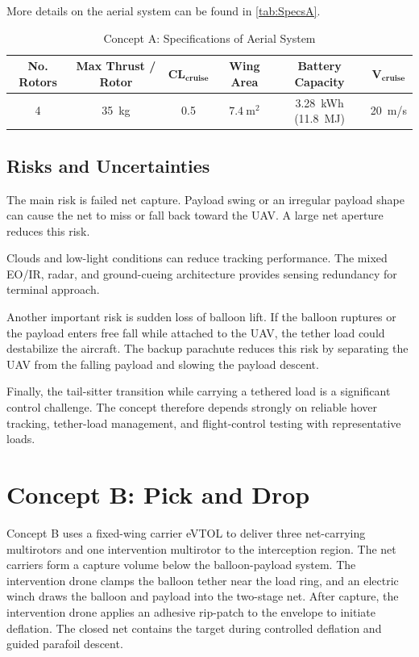 More details on the aerial system can be found in \autoref{tab:SpecsA}.



\begin{table}[H]
\centering
\caption{Concept A: Specifications of Aerial System}
\label{tab:SpecsA}
\begin{tabular}{cccccc}
\hline
\textbf{No. Rotors} & \textbf{Max Thrust / Rotor} & $\mathbf{CL_{cruise}}$ & \textbf{Wing Area} & \textbf{Battery Capacity} & $\mathbf{V_{cruise}}$ \\ \hline
4 & 35~kg & 0.5 & $7.4~\mathrm{m^2}$ & 3.28~kWh (11.8~MJ) & 20~m/s \\ \hline
\end{tabular}
\end{table}

\subsection{Risks and Uncertainties}
The main risk is failed net capture. Payload swing or an irregular
payload shape can cause the net to miss or fall back toward the UAV.
A large net aperture reduces this risk.

Clouds and low-light conditions can reduce tracking performance. The
mixed EO/IR, radar, and ground-cueing architecture provides sensing
redundancy for terminal approach.

Another important risk is sudden loss of balloon lift. If the balloon ruptures or the payload enters free fall while attached to the UAV, the tether load could destabilize the aircraft. The backup parachute reduces this risk by separating the UAV from the falling payload and slowing the payload descent.

Finally, the tail-sitter transition while carrying a tethered load is a significant control challenge. The concept therefore depends strongly on reliable hover tracking, tether-load management, and flight-control testing with representative loads.


\section{Concept B: Pick and Drop}
 

Concept B uses a fixed-wing carrier eVTOL to deliver three net-carrying
multirotors and one intervention multirotor to the interception region.
The net carriers form a capture volume below the balloon-payload system.
The intervention drone clamps the balloon tether near the load ring, and
an electric winch draws the balloon and payload into the two-stage net.
After capture, the intervention drone applies an adhesive rip-patch to
the envelope to initiate deflation. The closed net contains the target
during controlled deflation and guided parafoil descent.

